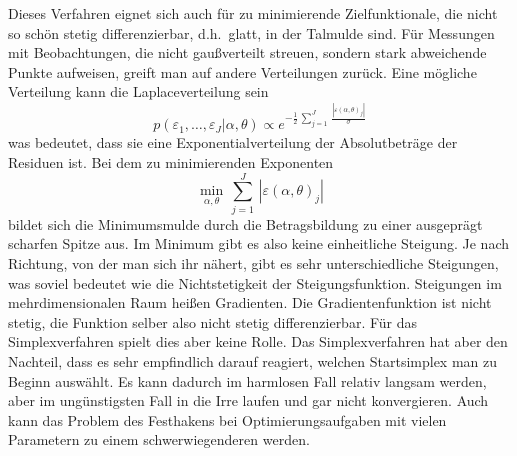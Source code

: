 Dieses Verfahren eignet sich auch für zu minimierende Zielfunktionale, die nicht so schön stetig
differenzierbar, d.h.\ glatt, in der Talmulde sind. Für Messungen mit Beobachtungen, die nicht gaußverteilt
streuen, sondern stark abweichende Punkte aufweisen, greift man auf andere Verteilungen zurück.
Eine mögliche Verteilung kann die Laplaceverteilung sein
\begin{equation}
p(\varepsilon_1,\dots,\varepsilon_J | \alpha, \theta)
\propto e^{-\frac{1}{2} \, \sum\limits_{j=1}^J \, \frac{| \varepsilon(\alpha,\theta)_j |}{\sigma} } 
\end{equation}
was bedeutet, dass sie eine Exponentialverteilung der Absolutbeträge der
Residuen ist. Bei dem zu minimierenden Exponenten
\begin{equation}
\min_{\alpha,\theta} \, \sum\limits_{j=1}^J \, | \varepsilon(\alpha,\theta)_j |
\end{equation}
bildet sich die Minimumsmulde durch die Betragsbildung zu einer ausgeprägt scharfen Spitze aus.
Im Minimum gibt es also keine einheitliche Steigung. Je nach Richtung, von der man sich ihr nähert,
gibt es sehr unterschiedliche Steigungen, was soviel bedeutet wie die Nichtstetigkeit der
Steigungsfunktion. Steigungen im mehrdimensionalen Raum heißen Gradienten. Die Gradientenfunktion
ist nicht stetig, die Funktion selber also nicht stetig differenzierbar. Für das Simplexverfahren
spielt dies aber keine Rolle. Das Simplexverfahren hat aber den Nachteil, dass es sehr 
empfindlich darauf reagiert, welchen Startsimplex man zu Beginn auswählt. Es kann dadurch
im harmlosen Fall relativ langsam werden, aber im ungünstigsten Fall in die Irre laufen und gar
nicht konvergieren. Auch kann das Problem des Festhakens bei Optimierungsaufgaben mit vielen
Parametern zu einem schwerwiegenderen werden.


